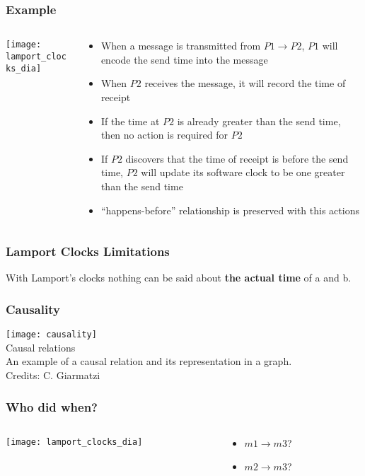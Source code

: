\documentclass[aspectratio=169, 15pt,usenames,dvipsnames]{beamer}
\begin{document}
	\begin{gdblank}
		\frametitle{Example}
		\begin{columns}
			\begin{column}{0.5\textwidth}
				\texttt{[image: lamport\_clocks\_dia]}			
			\end{column}
			\begin{column}{0.5\textwidth}
				\begin{itemize}
					\item When a message is transmitted from $P1 \rightarrow P2$, $P1$ will encode the send time into the message
					      \pause
					\item When $P2$ receives the message, it will record the time of receipt
					      \pause
					\item If the time at $P2$ is already greater than the send time, then no action is required for $P2$
					      \pause
					\item If $P2$ discovers that the time of receipt is before the send time, $P2$ will update its software clock to be one greater than the send time
					      \pause
					\item “happens-before” relationship is preserved with this actions
				\end{itemize}
			\end{column}	
		\end{columns}
	\end{gdblank}
	\begin{gdblank}
		\frametitle{Lamport Clocks Limitations}
		\centering
		\large		
		With Lamport’s clocks nothing can be said about \textbf{the actual time} of a and b.
	\end{gdblank}
	\begin{gdblank}
		\frametitle{Causality} 
		\texttt{[image: causality]}
		\centering\\Causal relations\\An example of a causal relation and its representation in a graph. 
		\tiny \\Credits: C. Giarmatzi
	\end{gdblank}   
	\begin{gdblank}
		\frametitle{Who did when?}
		\begin{columns}
			\begin{column}{0.5\textwidth}
				\texttt{[image: lamport\_clocks\_dia]}			
			\end{column}
			\begin{column}{0.5\textwidth}
				\begin{itemize}
					\item $m1 \rightarrow m3$?
					\item $m2 \rightarrow m3$? 
				\end{itemize}
			\end{column}	
		\end{columns}
	\end{gdblank}
\end{document}
